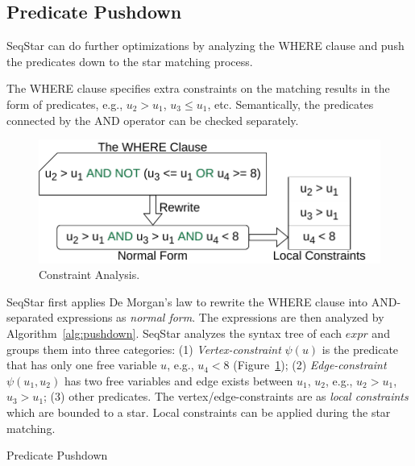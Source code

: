 \subsection{Predicate Pushdown}\label{sec:match_optimize}
SeqStar can do further optimizations by analyzing the WHERE clause and push the predicates down to the star matching process.

The WHERE clause specifies extra constraints on the matching results in the form of predicates,
e.g., $u_2 > u_1$, $u_3 \le u_1$, etc.
Semantically, the predicates connected by the AND operator can be checked separately.

\begin{figure}[ht]
  \centering
  \includegraphics[width=.4\textwidth]{img/constraints.pdf}
  \caption{Constraint Analysis.}\label{img:constraints}
\end{figure}

SeqStar first applies De Morgan's law to rewrite the WHERE clause into AND-separated expressions as \emph{normal form}.
The expressions are then analyzed by Algorithm~\ref{alg:pushdown}.
SeqStar analyzes the syntax tree of each $expr$ and groups them into three categories:
(1) \emph{Vertex-constraint} $\psi(u)$ is the predicate that has only one free variable $u$, e.g., $u_4 < 8$ (Figure~\ref{img:constraints});
(2) \emph{Edge-constraint} $\psi(u_1, u_2)$ has two free variables and edge exists between $u_1$, $u_2$, e.g., $u_2 > u_1$, $u_3 > u_1$;
(3) other predicates.
The vertex/edge-constraints are as \emph{local constraints} which are bounded to a star.
Local constraints can be applied during the star matching.

\begin{algorithm}[ht]
  \caption{Predicate Pushdown}\label{alg:pushdown}
\end{algorithm}

